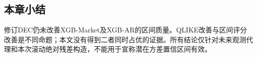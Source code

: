 \subsection{本章小结}
修订DEC仍未改善XGB-Market及XGB-AR的区间质量。QLIKE改善与区间评分改善是不同命题；本文没有得到二者同时占优的证据。所有结论仅针对未来观测代理和本次滚动绝对残差构造，不能用于宣称潜在方差置信区间有效。

